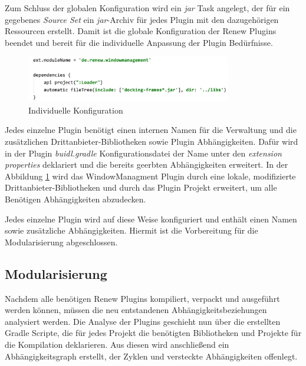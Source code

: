 	Zum Schluss der globalen Konfiguration wird ein \textit{jar} Task angelegt, der für ein gegebenes \textit{Source Set} ein \textit{jar}-Archiv für jedes Plugin mit den dazugehörigen Ressourcen erstellt. \newline
	Damit ist die globale Konfiguration der Renew Plugins beendet und bereit für die individuelle Anpassung der Plugin Bedürfnisse.\bigbreak

	\begin{figure}[h!]
	  \centering
	  \includegraphics[width=0.8\textwidth]{material/images/windmang.png}
	  \caption{Individuelle Konfiguration}
	  \label{fig:windmang}
	\end{figure}

	Jedes einzelne Plugin benötigt einen internen Namen für die Verwaltung und die zusätzlichen Drittanbieter-Bibliotheken sowie Plugin Abhängigkeiten. Dafür wird in der Plugin \textit{buidl.gradle} Konfigurationsdatei der Name unter den \textit{extension properties} deklariert und die bereits geerbten Abhängigkeiten erweitert. In der Abbildung \ref{fig:windmang} wird das WindowManagment Plugin durch eine lokale, modifizierte Drittanbieter-Bibliotheken  und durch das Plugin Projekt erweitert, um alle Benötigen Abhängigkeiten abzudecken.\bigbreak

	Jedes einzelne Plugin wird auf diese Weise konfiguriert und enthält einen Namen sowie zusätzliche Abhängigkeiten. Hiermit ist die Vorbereitung für die Modularisierung abgeschlossen. 


\subsection{Modularisierung}	
	Nachdem alle benötigen Renew Plugins kompiliert, verpackt und ausgeführt werden können, müssen die neu entstandenen Abhängigkeitsbeziehungen analysiert werden. Die Analyse der Plugins geschieht nun über die erstellten Gradle Scripte, die für jedes Projekt die benötigten Bibliotheken und Projekte für die Kompilation deklarieren. Aus diesen wird anschließend ein Abhängigkeitsgraph erstellt, der Zyklen und versteckte Abhängigkeiten offenlegt. \bigbreak

